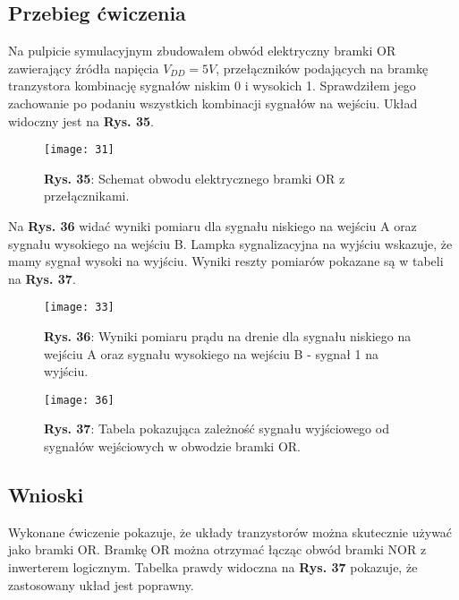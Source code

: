 \documentclass[11pt]{article}
\begin{document}
\subsection{Przebieg ćwiczenia}
Na pulpicie symulacyjnym zbudowałem obwód elektryczny bramki OR zawierający źródła napięcia $V_{DD}=5V$, przełączników podających na bramkę tranzystora kombinację sygnałów niskim 0 i wysokich 1. Sprawdziłem jego zachowanie
po podaniu wszystkich kombinacji sygnałów na wejściu. Układ widoczny jest na \textbf{Rys. 35}.
\begin{figure}[H]
\centering
\texttt{[image: 31]}
\caption*{\textbf{Rys. 35}: Schemat obwodu elektrycznego bramki OR z przełącznikami. }
\end{figure}
\noindent Na \textbf{Rys. 36} widać wyniki pomiaru dla sygnału niskiego na wejściu A oraz sygnału wysokiego na wejściu B. Lampka sygnalizacyjna na wyjściu wskazuje, że mamy sygnał wysoki na wyjściu. Wyniki reszty pomiarów pokazane są w tabeli na \textbf{Rys. 37}.
\begin{figure}[H]
\centering
\texttt{[image: 33]}
\caption*{\textbf{Rys. 36}: Wyniki pomiaru prądu na drenie dla sygnału niskiego na wejściu A oraz sygnału wysokiego na wejściu B - sygnał 1 na wyjściu. }
\end{figure}
\begin{figure}[H]
\centering
\texttt{[image: 36]}
\caption*{\textbf{Rys. 37}: Tabela pokazująca zależność sygnału wyjściowego od sygnałów wejściowych w obwodzie bramki OR.}
\end{figure}
\subsection{Wnioski}
Wykonane ćwiczenie pokazuje, że układy tranzystorów można skutecznie używać jako bramki OR. Bramkę OR można otrzymać łącząc obwód bramki NOR z inwerterem logicznym. Tabelka prawdy widoczna na \textbf{Rys. 37} pokazuje, że zastosowany układ jest poprawny.
\end{document}
